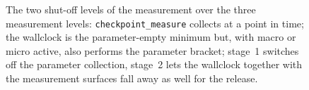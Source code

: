\begin{nurlang}
\begin{figure}[htbp]
\caption[The two shut-off levels of the measurement]{The two shut-off levels of the measurement over the three measurement levels:
\texttt{checkpoint\_measure} collects at a point in time; the wallclock is the parameter-empty minimum
but, with macro or micro active, also performs the parameter bracket; stage~1 switches off the
parameter collection, stage~2 lets the wallclock together with the measurement surfaces fall away as
well for the release.}\label{fig:abschaltungsstufen}
\end{figure}
\end{nurlang}
